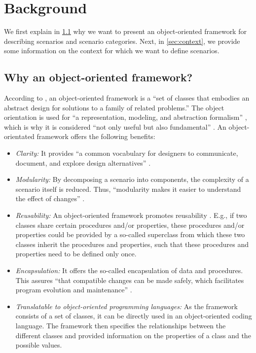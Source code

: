 \section{Background}
\label{sec:background}

We first explain in \cref{sec:why oo framework} why we want to present an \cstartc object-oriented framework \cendc for describing scenarios and  scenario categories. Next, in \cref{sec:context}, we provide some information on the context for which we want to define scenarios. 


\cstartb
\subsection{Why an  object-oriented framework?}
\label{sec:why oo framework}

According to \textcite{johnson1988designing}, an object-oriented framework is a ``set of classes that embodies an abstract design for solutions to a family of related problems.''
The object orientation is used for ``a representation, modeling, and abstraction formalism'' \autocite{wegner1990concepts}, which is why it is considered ``not only useful but also fundamental'' \autocite{wegner1990concepts}. An object-orientated framework offers the following benefits:
\begin{itemize}
	\item \cendb\cstartc\emph{Clarity:} \cendc\cstartb It provides ``a common vocabulary for designers to communicate, document, and explore design alternatives'' \autocite{gamma1993design}.
	\item \cendb\cstartc\emph{Modularity:} By decomposing a scenario into components, the complexity of a scenario itself is reduced. Thus, ``modularity makes it easier to understand the effect of changes'' \cite{johnson1988designing}.
	\item \emph{Reusability:} \cendc\cstartb An object-oriented framework promotes reusability \autocite{snyder1986encapsulation, meyer1987reusability, johnson1988designing}. E.g., if two classes share certain procedures and/or properties, these procedures and/or properties could be provided by a so-called superclass from which these two classes inherit the procedures and properties, such that these procedures and properties need to be defined only once.
	\item \cendb\cstartc\emph{Encapsulation:} \cendc\cstartb It offers the so-called encapsulation of data and procedures. This assures ``that compatible changes can be made safely, which facilitates program evolution and maintenance'' \autocite{snyder1986encapsulation}.
	\item \cendb\cstartc\emph{Translatable to object-oriented programming languages:} \cendc\cstartb As the framework consists of a set of classes, it can be directly used in an object-oriented coding language. The framework then specifies the relationships between the different classes and provided information on the properties of a class and the possible values.
\end{itemize}
